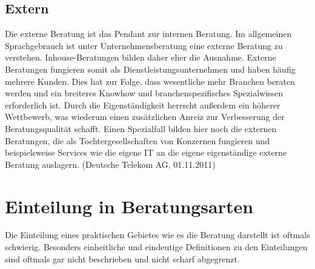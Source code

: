 \section{Extern}
Die externe Beratung ist das Pendant zur internen Beratung. Im allgemeinen Sprachgebrauch ist unter Unternehmensberatung eine externe Beratung zu verstehen. Inhouse-Beratungen bilden daher eher die Ausnahme. Externe Beratungen fungieren somit als Dienstleistungsunternehmen und haben häufig mehrere Kunden. Dies hat zur Folge, dass wesentliche mehr Branchen beraten werden und ein breiteres Knowhow und branchenspezifisches Spezialwissen erforderlich ist. Durch die Eigenständigkeit herrscht außerdem ein höherer Wettbewerb, was wiederum einen zusätzlichen Anreiz zur Verbesserung der Beratungsqualität schafft.
Einen Spezialfall bilden hier noch die externen Beratungen, die als Tochtergesellschaften von Konzernen fungieren und beispielsweise Services wie die eigene IT an die eigene eigenständige externe Beratung auslagern. (Deutsche Telekom AG, 01.11.2011)

\chapter{Einteilung in Beratungsarten}
Die Einteilung eines praktischen Gebietes wie es die Beratung darstellt ist oftmals schwierig. Besonders einheitliche und eindeutige Definitionen zu den Einteilungen sind oftmals gar nicht beschrieben und nicht scharf abgegrenzt. 

